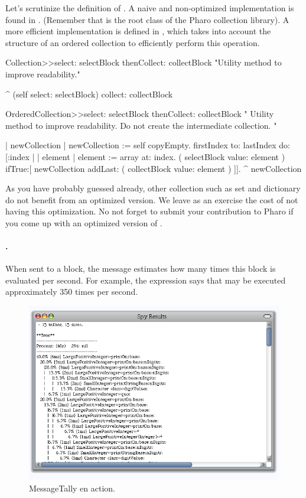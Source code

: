\documentclass[a4paper,10pt,twoside]{book}
\begin{document}
Let's scrutinize the definition of . A naive and non-optimized implementation is found in . (Remember that  is the root class of the Pharo collection library). A more efficient implementation is defined in , which takes into account the structure of an ordered collection to efficiently perform this operation.

\begin{code}{}
Collection>>select: selectBlock thenCollect: collectBlock
	"Utility method to improve readability."

	^ (self select: selectBlock) collect: collectBlock
\end{code}

\begin{code}{}
OrderedCollection>>select: selectBlock thenCollect: collectBlock
    " Utility method to improve readability.
	Do not create the intermediate collection. "

	| newCollection |
    newCollection := self copyEmpty.
    firstIndex to: lastIndex do:[:index |
		| element |
		element := array at: index.
		( selectBlock value: element ) 
			ifTrue:[ newCollection addLast: ( collectBlock value: element ) ]].
    ^ newCollection
\end{code}

As you have probably guessed already, other collection such as set and dictionary do not benefit from an optimized version. We leave as an exercise the cost of not having this optimization. No not forget to submit your contribution to Pharo if you come up with an optimized version of .


\paragraph{.} When sent to a block, the  message estimates how many times this block is evaluated per second. For example, the expression  says that  may be executed approximately 350 times per second.

\begin{figure}
	\begin{center}
	\includegraphics[width=.8\linewidth]{MessageTallyOne}
	\caption{MessageTally en action.}
	\end{center}
\end{figure}
\end{document}
